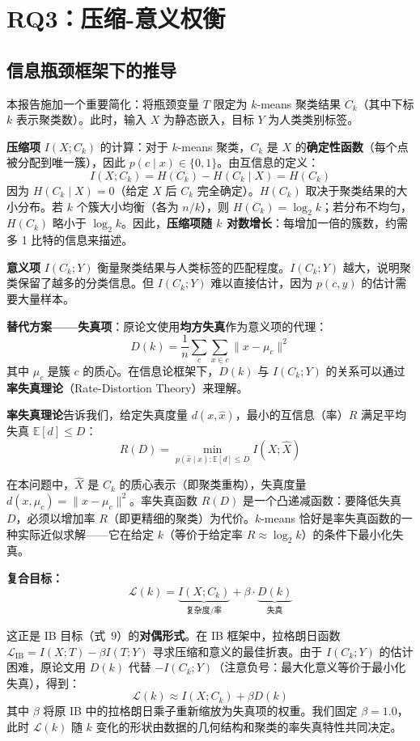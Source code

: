 \documentclass[11pt,a4paper]{article}
\newcommand{\E}{\mathbb{E}}
\begin{document}
\section{RQ3：压缩-意义权衡}

\subsection{信息瓶颈框架下的推导}

本报告施加一个重要简化：将瓶颈变量 $T$ 限定为 $k$-means 聚类结果 $C_k$（其中下标 $k$ 表示聚类数）。此时，输入 $X$ 为静态嵌入，目标 $Y$ 为人类类别标签。

\textbf{压缩项} $I(X; C_k)$ 的计算：对于 $k$-means 聚类，$C_k$ 是 $X$ 的\textbf{确定性函数}（每个点被分配到唯一簇），因此 $p(c \mid x) \in \{0,1\}$。由互信息的定义：
\[
I(X; C_k) = H(C_k) - H(C_k \mid X) = H(C_k)
\tag{15}
\]
因为 $H(C_k \mid X) = 0$（给定 $X$ 后 $C_k$ 完全确定）。$H(C_k)$ 取决于聚类结果的大小分布。若 $k$ 个簇大小均衡（各为 $n/k$），则 $H(C_k) = \log_2 k$；若分布不均匀，$H(C_k)$ 略小于 $\log_2 k$。因此，\textbf{压缩项随 $k$ 对数增长}：每增加一倍的簇数，约需多 1 比特的信息来描述。

\textbf{意义项} $I(C_k; Y)$ 衡量聚类结果与人类标签的匹配程度。$I(C_k; Y)$ 越大，说明聚类保留了越多的分类信息。但 $I(C_k; Y)$ 难以直接估计，因为 $p(c,y)$ 的估计需要大量样本。

\textbf{替代方案——失真项}：原论文使用\textbf{均方失真}作为意义项的代理：
\[
D(k) = \frac{1}{n}\sum_{c} \sum_{x \in c} \|x - \mu_c\|^2
\tag{16}
\]
其中 $\mu_c$ 是簇 $c$ 的质心。在信息论框架下，$D(k)$ 与 $I(C_k; Y)$ 的关系可以通过\textbf{率失真理论}（Rate-Distortion Theory）来理解。

\textbf{率失真理论}告诉我们，给定失真度量 $d(x,\hat{x})$，最小的互信息（率）$R$ 满足平均失真 $\E[d] \leq D$：
\[
R(D) = \min_{p(\hat{x} \mid x): \E[d] \leq D} I(X; \hat{X})
\tag{16}
\]

在本问题中，$\hat{X}$ 是 $C_k$ 的质心表示（即聚类重构），失真度量 $d(x, \mu_c) = \|x - \mu_c\|^2$。率失真函数 $R(D)$ 是一个凸递减函数：要降低失真 $D$，必须以增加率 $R$（即更精细的聚类）为代价。$k$-means 恰好是率失真函数的一种实际近似求解——它在给定 $k$（等价于给定率 $R \approx \log_2 k$）的条件下最小化失真。

\textbf{复合目标：}
\[
\mathcal{L}(k) = \underbrace{I(X; C_k)}_{\text{复杂度/率}} + \beta \cdot \underbrace{D(k)}_{\text{失真}}
\tag{18}
\]

这正是 IB 目标（式~9）的\textbf{对偶形式}。在 IB 框架中，拉格朗日函数 $\mathcal{L}_{\text{IB}} = I(X;T) - \beta I(T;Y)$ 寻求压缩和意义的最佳折衷。由于 $I(C_k;Y)$ 的估计困难，原论文用 $D(k)$ 代替 $-I(C_k;Y)$（注意负号：最大化意义等价于最小化失真），得到：
\[
\mathcal{L}(k) \approx I(X; C_k) + \beta D(k)
\]
其中 $\beta$ 将原 IB 中的拉格朗日乘子重新缩放为失真项的权重。我们固定 $\beta = 1.0$，此时 $\mathcal{L}(k)$ 随 $k$ 变化的形状由数据的几何结构和聚类的率失真特性共同决定。
\end{document}
